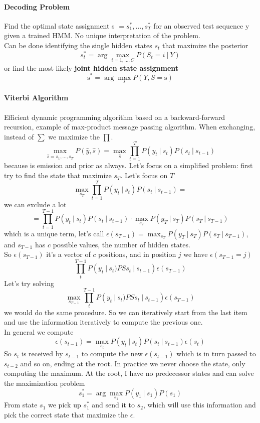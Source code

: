 \documentclass[10pt]{report}
\begin{document}
\paragraph{Decoding Problem} Find the optimal state assignment s $= s_1^*,\ldots,s_T^*$ for an observed test sequence y given a trained HMM. No unique interpretation of the problem.\\
Can be done identifying the single hidden states $s_t$ that maximize the posterior $$s_t^*=\arg\max_{i=1,\ldots,C}P(S_t=i\:|\:Y)$$ 
or find the most likely \textbf{joint hidden state assignment} 
$$\text{s}^* = \arg\max_s P(Y,S = \text{s})$$
\paragraph{Viterbi Algorithm} Efficient dynamic programming algorithm based on a backward-forward recursion, example of max-product message passing algorithm. When exchanging, instead of $\sum$ we maximize the $\prod$.
$$\max_{\hat{s} = s_1,\ldots,s_T} P(\hat{y},\hat{s}) = \max_{\hat{s}}\prod_{t=1}^T P(y_t\:|\:s_t)P(s_t\:|\:s_{t-1})$$
because is emission and prior as always. Let's focus on a simplified problem: first try to find the state that maximize $s_T$. Let's focus on $T$
$$\max_{s_T}\prod_{t=1}^T P(y_t\:|\:s_t)P(s_t\:|\:s_{t-1})=$$
we can exclude a lot
$$=\prod_{t=1}^{T-1} P(y_t\:|\:s_t)P(s_t\:|\:s_{t-1})\cdot\max_{s_T}P(y_T\:|\:s_T)P(s_T\:|\:s_{T-1})$$
which is a unique term, let's call $\epsilon(s_{T-1}) = \max_{s_T}P(y_T\:|\:s_T)P(s_T\:|\:s_{T-1})$, and $s_{T-1}$ has $c$ possible values, the number of hidden states.\\
So $\epsilon(s_{T-1})$ it's a vector of $c$ positions, and in position $j$ we have $\epsilon(s_{T-1} = j)$
$$\prod_t^{T-1} P(y_t\:|\:s_t)PSs_t\:|\:s_{t-1})\epsilon(s_{T-1})$$
Let's try solving 
$$\max_{s_{T-1}} \prod_t^{T-1} P(y_t\:|\:s_t)PSs_t\:|\:s_{t-1})\epsilon(s_{T-1})$$
we would do the same procedure. So we can iteratively start from the last item and use the information iteratively to compute the previous one.\\
In general we compute $$\epsilon(s_{t-1}) = \max_{s_t} P(y_t\:|\:s_t)P(s_t\:|\:s_{t-1})\epsilon(s_t)$$
So $s_t$ is received by $s_{t-1}$ to compute the new $\epsilon(s_{t-1})$ which is in turn passed to $s_{t-2}$ and so on, ending at the root. In practice we never choose the state, only computing the maximum. At the root, I have no predecessor states and can solve the maximization problem
$$s_1^* = \arg\max_{s_1}P(y_1\:|\:s_1)P(s_1)$$
From state $s_1$ we pick up $s_1^*$ and send it to $s_2$, which will use this information and pick the correct state that maximize the $\epsilon$.
\end{document}
